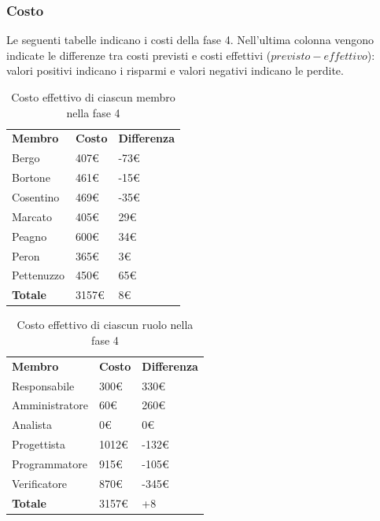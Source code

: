 	\subsubsection{Costo}
		Le seguenti tabelle indicano i costi della fase 4. Nell'ultima colonna vengono indicate le differenze tra costi previsti e costi effettivi ($previsto - effettivo$): valori positivi indicano i risparmi e valori negativi indicano le perdite.
		
		\begin{table}[H]
			\centering
			\begin{tabular}{| l | l | l |}
				\rowcolor{LightBlue}
				\textbf{\color{white}Membro}
				& \textbf{\color{white}Costo}
				& \textbf{\color{white}Differenza}\\
				Bergo		& 407€	& -73€\\
				Bortone		& 461€	& -15€\\
				Cosentino	& 469€	& -35€\\
				Marcato		& 405€	& 29€\\
				Peagno		& 600€	& 34€\\
				Peron		& 365€	& 3€\\
				Pettenuzzo	& 450€	& 65€\\ \hline
				\textbf{Totale} & 3157€	& 8€\\ \hline
			\end{tabular}
			\caption{Costo effettivo di ciascun membro nella fase 4}	
		\end{table}
		
	\begin{table}[H]
		\centering
		\begin{tabular}{| l | l |l|}
			\rowcolor{LightBlue}
			\textbf{\color{white}Membro}
			& \textbf{\color{white}Costo}
			& \textbf{\color{white}Differenza}\\
			
			Responsabile	& 300€	& 330€\\
			Amministratore 	& 60€ 	& 260€\\
			Analista 		& 0€ 	& 0€\\
			Progettista 	& 1012€	& -132€\\
			Programmatore 	& 915€	& -105€\\
			Verificatore 	& 870€	& -345€\\ \hline
			\textbf{Totale} & 3157€	& +8\\ \hline
		\end{tabular}
		\caption{Costo effettivo di ciascun ruolo nella fase 4}
	\end{table}
	
